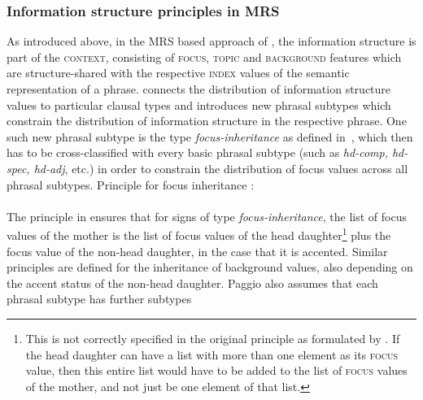 \documentclass[output=paper
	        ,collection
	        ,collectionchapter
 	        ,biblatex
                ,babelshorthands
                ,newtxmath
                ,draftmode
                ,colorlinks, citecolor=brown
]{langscibook}
\begin{document}
\subsubsection{Information structure principles in MRS}

As introduced above, in the MRS based approach of \cite{Paggio2009a-u}, the
information structure is part of the \textsc{context}, consisting of
\textsc{focus}, \textsc{topic} and \textsc{background} features which
are structure-shared with the respective \textsc{index} values of the
semantic representation of a phrase. \cite{Paggio2009a-u} connects the
distribution of information structure values to particular clausal
types and introduces new phrasal subtypes which constrain the
distribution of information structure in the respective phrase. One
such new phrasal subtype is the type
\textit{focus-inheritance} as defined in~, which then has to be cross-classified
with every basic phrasal subtype (such as \textit{hd-comp, hd-spec,
  hd-adj}, etc.) in order to constrain the distribution of focus
values across all phrasal subtypes.
\ea
Principle for focus inheritance \citep[155]{Paggio2009a-u}:\\
   \impl \\
    \label{fig:focus-inheritance}
    \z
The principle in  ensures that for
signs of type \textit{focus-inheritance}, the list of focus values
of the mother is the list of focus values of the head
daughter\footnote{This is not correctly specified in the original
principle as formulated by \citet{Paggio2009a-u}. If the
head daughter can have a list with more than one element as its
\textsc{focus} value, then this entire list would have to be
added to the list of \textsc{focus} values of the mother, and
not just be one element of that list.} plus the focus value of
the non-head daughter, in the case that it is accented. Similar principles
are defined for the inheritance of background values, also
depending on the accent status of the non-head daughter. Paggio
also assumes that each phrasal subtype has further subtypes
\end{document}
